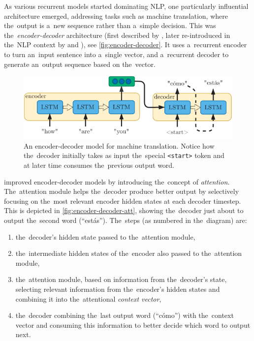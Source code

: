 \documentclass[bsc,frontabs,singlespacing,parskip,deptreport]{infthesis}
\begin{document}
{{    %
    As various recurrent models started dominating NLP, one particularly influential architecture emerged, addressing tasks such as machine translation, where the~output is a~new sequence rather than a~simple decision. This was the~\textit{encoder-decoder} architecture (first described by \citet{Hinton_1994}, later re-introduced in the~NLP context by \citet{Kalchbrenner_2013} and \citet{Sutskever_2014}), see \autoref{fig:encoder-decoder}. It uses a~recurrent encoder to turn an~input sentence into a~single vector, and a~recurrent decoder to generate an~output sequence based on the~vector.
    \begin{figure}[h!t]
      \centering
      \includegraphics[width=11.5cm]{graphics/encoder-decoder}
      \cprotect\caption{An encoder-decoder model for machine translation. Notice how the~decoder initially takes as input the~special \verb|<start>| token and at later time consumes the~previous output word.}
      \label{fig:encoder-decoder}
    \end{figure}

    \citet{Bahdanau_2014} improved encoder-decoder models by introducing the~concept of \textit{attention}. The~attention module helps the~decoder produce better output by selectively focusing on the~most relevant encoder hidden states at each decoder timestep. This is depicted in \autoref{fig:encoder-decoder-att}, showing the~decoder just about to output the~second word (``est\'as''). The~steps (as numbered in the~diagram) are:
    \begin{enumerate}
      \item the~decoder's hidden state passed to the~attention module,
      \item the~intermediate hidden states of the~encoder also passed to the~attention module,
      \item the~attention module, based on information from the~decoder's state, selecting relevant information from the~encoder's hidden states and combining it into the~attentional \textit{context vector},
      \item the~decoder combining the~last output word (``c\'omo'') with the~context vector and consuming this information to better decide which word to output next. 
    \end{enumerate}

}}
\end{document}
